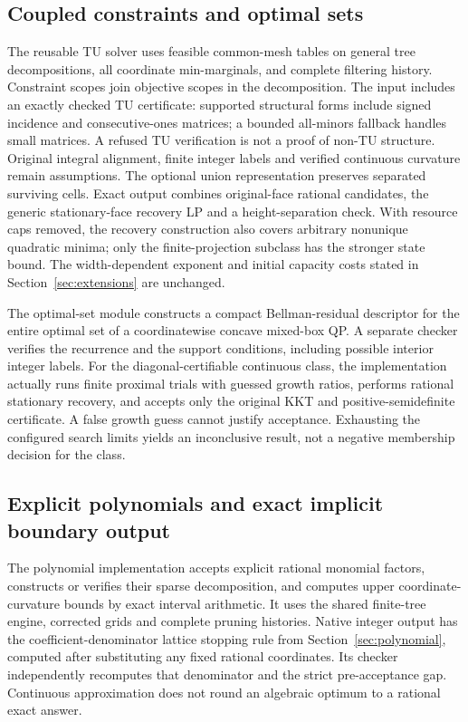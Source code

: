 \subsection{Coupled constraints and optimal sets}
The reusable TU solver uses feasible common-mesh tables on general tree
decompositions, all coordinate min-marginals, and complete filtering
history. Constraint scopes join objective scopes in the decomposition.
The input includes an exactly checked TU certificate: supported structural
forms include signed incidence and consecutive-ones matrices; a bounded
all-minors fallback handles small matrices. A refused TU verification is
not a proof of non-TU structure. Original integral alignment, finite
integer labels and verified continuous curvature remain assumptions.
The optional union representation preserves separated surviving cells.
Exact output combines original-face rational candidates, the generic
stationary-face recovery LP and a height-separation check. With resource
caps removed, the recovery construction also covers arbitrary nonunique
quadratic minima; only the finite-projection subclass has the stronger
state bound. The width-dependent exponent and initial capacity costs
stated in Section~\ref{sec:extensions} are unchanged.

The optimal-set module constructs a compact Bellman-residual descriptor
for the entire optimal set of a coordinatewise concave mixed-box QP. A
separate checker verifies the recurrence and the support conditions,
including possible interior integer labels. For the diagonal-certifiable
continuous class, the implementation actually runs finite proximal trials
with guessed growth ratios, performs rational stationary recovery, and
accepts only the original KKT and positive-semidefinite certificate. A
false growth guess cannot justify acceptance. Exhausting the configured
search limits yields an inconclusive result, not a negative membership
decision for the class.

\subsection{Explicit polynomials and exact implicit boundary output}
The polynomial implementation accepts explicit rational monomial factors,
constructs or verifies their sparse decomposition, and computes upper
coordinate-curvature bounds by exact interval arithmetic. It uses the shared
finite-tree engine, corrected grids and complete pruning histories. Native
integer output has the coefficient-denominator lattice stopping rule from
Section~\ref{sec:polynomial}, computed after substituting any fixed rational
coordinates. Its checker independently recomputes that denominator and the
strict pre-acceptance gap. Continuous approximation does not round an
algebraic optimum to a rational exact answer.

